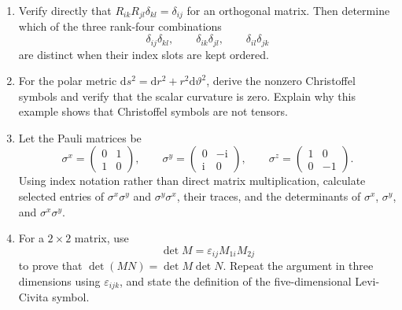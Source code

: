 \begin{enumerate}
    \item\label{ex:tensor-isotropic} Verify directly that $R_{ik}R_{jl}\delta_{kl}=\delta_{ij}$ for an orthogonal matrix. Then determine which of the three rank-four combinations
    \begin{equation*}
        \delta_{ij}\delta_{kl},
        \qquad
        \delta_{ik}\delta_{jl},
        \qquad
        \delta_{il}\delta_{jk}
    \end{equation*}
    are distinct when their index slots are kept ordered.

    \item\label{ex:christoffel-polar} For the polar metric $\mathrm{d}s^2=\mathrm{d}r^2+r^2\mathrm{d}\vartheta^2$, derive the nonzero Christoffel symbols and verify that the scalar curvature is zero. Explain why this example shows that Christoffel symbols are not tensors.

    \item\label{ex:pauli-index} Let the Pauli matrices be
    \begin{equation*}
        \sigma^x=\begin{pmatrix}0&1\\1&0\end{pmatrix},
        \qquad
        \sigma^y=\begin{pmatrix}0&-\mathrm{i}\\\mathrm{i}&0\end{pmatrix},
        \qquad
        \sigma^z=\begin{pmatrix}1&0\\0&-1\end{pmatrix}.
    \end{equation*}
    Using index notation rather than direct matrix multiplication, calculate selected entries of $\sigma^x\sigma^y$ and $\sigma^y\sigma^x$, their traces, and the determinants of $\sigma^x$, $\sigma^y$, and $\sigma^x\sigma^y$.

    \item\label{ex:epsilon-determinant} For a $2\times2$ matrix, use
    \begin{equation*}
        \det M=\varepsilon_{ij}M_{1i}M_{2j}
    \end{equation*}
    to prove that $\det(MN)=\det M\det N$. Repeat the argument in three dimensions using $\varepsilon_{ijk}$, and state the definition of the five-dimensional Levi-Civita symbol.


\end{enumerate}
